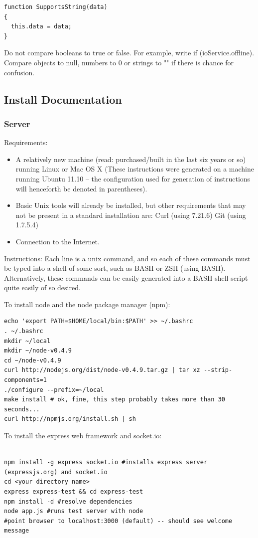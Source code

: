 \documentclass[letterpaper,12pt]{article}
\begin{document}
\begin{verbatim}
function SupportsString(data)
{
  this.data = data;
}
\end{verbatim}
Do not compare booleans to true or false. For example, write if (ioService.offline). Compare objects to null, numbers to 0 or strings to "" if there is chance for confusion.

\subsection{Install Documentation}
\subsubsection{Server}
Requirements:
\begin{itemize}
\item A relatively new machine (read: purchased/built in the last six years or so) running Linux or Mac OS X (These instructions were generated on a machine running Ubuntu 11.10 -- the configuration used for generation of instructions will henceforth be denoted in parentheses).
\item Basic Unix tools will already be installed, but other requirements that may not be present in a standard installation are:
Curl (using 7.21.6)
Git (using 1.7.5.4)
\item Connection to the Internet. 
\end{itemize}
Instructions:
Each line is a unix command, and so each of these commands must be typed into a shell of some sort, such as BASH or ZSH (using BASH). Alternatively, these commands can be easily generated into a BASH shell script quite easily of so desired.

To install node and the node package manager (npm):

\begin{verbatim}
echo 'export PATH=$HOME/local/bin:$PATH' >> ~/.bashrc
. ~/.bashrc
mkdir ~/local
mkdir ~/node-v0.4.9
cd ~/node-v0.4.9
curl http://nodejs.org/dist/node-v0.4.9.tar.gz | tar xz --strip-components=1
./configure --prefix=~/local
make install # ok, fine, this step probably takes more than 30 seconds...
curl http://npmjs.org/install.sh | sh
\end{verbatim}

To install the express web framework and socket.io:

\begin{verbatim}

npm install -g express socket.io #installs express server (expressjs.org) and socket.io
cd <your directory name>
express express-test && cd express-test
npm install -d #resolve dependencies
node app.js #runs test server with node
#point browser to localhost:3000 (default) -- should see welcome message
\end{verbatim}
\end{document}
